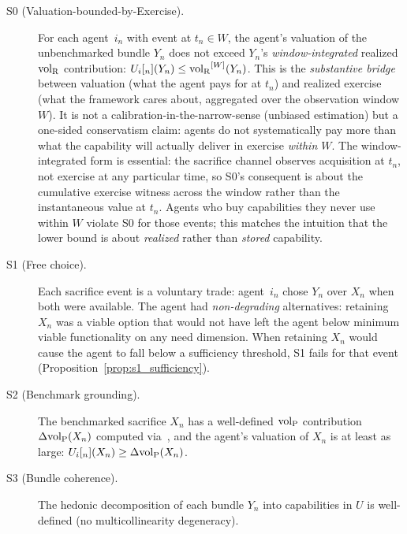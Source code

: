 \begin{description}
\item[S0 (Valuation-bounded-by-Exercise).] For each agent~$i_n$
  with event at $t_n \in W$, the agent's valuation of the
  unbenchmarked bundle $Y_n$ does not exceed $Y_n$'s
  \emph{window-integrated} realized ${\operatorname{vol}_{\mathrm{R}}}$ contribution:
  $U_i[_{n}](Y_n) \leq {\operatorname{vol}_{\mathrm{R}}}^{[W]}(Y_n)$.
  This is the \emph{substantive bridge} between valuation (what
  the agent pays for at $t_n$) and realized exercise (what the
  framework cares about, aggregated over the observation window
  $W$).  It is not a calibration-in-the-narrow-sense (unbiased
  estimation) but a one-sided conservatism claim: agents do not
  systematically pay more than what the capability will actually
  deliver in exercise \emph{within $W$}.  The window-integrated
  form is essential: the sacrifice channel observes acquisition
  at $t_n$, not exercise at any particular time, so S0's
  consequent is about the cumulative exercise witness across the
  window rather than the instantaneous value at $t_n$.  Agents
  who buy capabilities they never use within $W$ violate S0 for
  those events; this matches the intuition that the lower bound
  is about \emph{realized} rather than \emph{stored} capability.

\item[S1 (Free choice).] Each sacrifice event is a voluntary
  trade: agent~$i_n$ chose $Y_n$ over $X_n$ when both were
  available.  The agent had \emph{non-degrading} alternatives:
  retaining $X_n$ was a viable option that would not have left
  the agent below minimum viable functionality on any need
  dimension.  When retaining $X_n$ would cause the agent to
  fall below a sufficiency threshold, S1 fails for that event
  (Proposition~\ref{prop:s1_sufficiency}).

\item[S2 (Benchmark grounding).] The benchmarked sacrifice $X_n$
  has a well-defined ${\operatorname{vol}_{\mathrm{P}}}$ contribution $\Delta{\operatorname{vol}_{\mathrm{P}}}(X_n)$
  computed via~\citep[Proposition~1]{lasser2026poset}, and the
  agent's valuation of $X_n$ is at least as large:
  $U_i[_{n}](X_n) \geq \Delta{\operatorname{vol}_{\mathrm{P}}}(X_n)$.

\item[S3 (Bundle coherence).] The hedonic decomposition of each
  bundle $Y_n$ into capabilities in $U$ is well-defined (no
  multicollinearity degeneracy).


\end{description}
